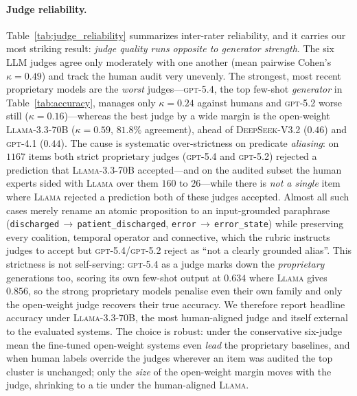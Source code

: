 \paragraph{Judge reliability.}
{\sloppy\setlength{\emergencystretch}{3em}
Table~\ref{tab:judge_reliability} summarizes inter-rater reliability, and it carries our most striking result: \emph{judge quality runs opposite to generator strength}. The six LLM judges agree only moderately with one another (mean pairwise Cohen's $\kappa=0.49$) and track the human audit very unevenly. The strongest, most recent proprietary models are the \emph{worst} judges---\textsc{gpt-5.4}, the top few-shot \emph{generator} in Table~\ref{tab:accuracy}, manages only $\kappa=0.24$ against humans and \textsc{gpt-5.2} worse still ($\kappa=0.16$)---whereas the best judge by a wide margin is the open-weight \textsc{Llama-3.3-70B} ($\kappa=0.59$, $81.8\%$ agreement), ahead of \textsc{DeepSeek-V3.2} ($0.46$) and \textsc{gpt-4.1} ($0.44$). The cause is systematic over-strictness on predicate \emph{aliasing}: on $1167$ items both strict proprietary judges (\textsc{gpt-5.4} and \textsc{gpt-5.2}) rejected a prediction that \textsc{Llama-3.3-70B} accepted---and on the audited subset the human experts sided with \textsc{Llama} over them $160$ to $26$---while there is \emph{not a single} item where \textsc{Llama} rejected a prediction both of these judges accepted. Almost all such cases merely rename an atomic proposition to an input-grounded paraphrase (\texttt{discharged}\,$\to$\,\texttt{patient\_discharged}, \texttt{error}\,$\to$\,\texttt{error\_state}) while preserving every coalition, temporal operator and connective, which the rubric instructs judges to accept but \textsc{gpt-5.4}/\textsc{gpt-5.2} reject as ``not a clearly grounded alias''. This strictness is not self-serving: \textsc{gpt-5.4} as a judge marks down the \emph{proprietary} generations too, scoring its own few-shot output at $0.634$ where \textsc{Llama} gives $0.856$, so the strong proprietary models penalise even their own family and only the open-weight judge recovers their true accuracy. We therefore report headline accuracy under \textsc{Llama-3.3-70B}, the most human-aligned judge and itself external to the evaluated systems. The choice is robust: under the conservative six-judge mean the fine-tuned open-weight systems even \emph{lead} the proprietary baselines, and when human labels override the judges wherever an item was audited the top cluster is unchanged; only the \emph{size} of the open-weight margin moves with the judge, shrinking to a tie under the human-aligned \textsc{Llama}.\par}


